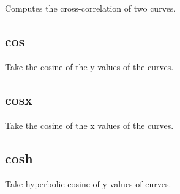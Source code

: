 \documentclass[letterpaper,10pt,english]{sphinxmanual}
\begin{document}
\subsection{}
\label{\detokenize{math_operations:correl-2-4-2}}
Computes the cross-correlation of two curves.

\begin{sphinxVerbatim}[commandchars=\\\{\}]
\PYG{p}{[}\PYG{p}{]}   
\end{sphinxVerbatim}


\subsection{cos}
\label{\detokenize{math_operations:cos}}
Take the cosine of the y values of the curves.

\begin{sphinxVerbatim}[commandchars=\\\{\}]
\PYG{p}{[}\PYG{p}{]}  
\end{sphinxVerbatim}


\subsection{cosx}
\label{\detokenize{math_operations:cosx}}
Take the cosine of the x values of the curves.

\begin{sphinxVerbatim}[commandchars=\\\{\}]
\PYG{p}{[}\PYG{p}{]}  
\end{sphinxVerbatim}


\subsection{cosh}
\label{\detokenize{math_operations:cosh}}
Take hyperbolic cosine of y values of curves.

\begin{sphinxVerbatim}[commandchars=\\\{\}]
\PYG{p}{[}\PYG{p}{]}  
\end{sphinxVerbatim}
\end{document}
